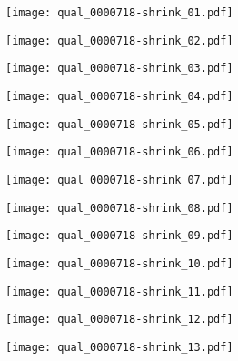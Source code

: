 \documentclass[10pt,twocolumn,letterpaper]{article}
\begin{document}
\begin{figure*}[t]
\centering
\begin{minipage}{0.058\textwidth} \centering \texttt{[image: qual\_0000718-shrink\_01.pdf]} \end{minipage}
 \begin{minipage}{0.058\textwidth} \centering \texttt{[image: qual\_0000718-shrink\_02.pdf]} \end{minipage}
 \begin{minipage}{0.058\textwidth} \centering \texttt{[image: qual\_0000718-shrink\_03.pdf]} \end{minipage}
 \begin{minipage}{0.058\textwidth} \centering \texttt{[image: qual\_0000718-shrink\_04.pdf]} \end{minipage}
 \begin{minipage}{0.058\textwidth} \centering \texttt{[image: qual\_0000718-shrink\_05.pdf]} \end{minipage}
 \begin{minipage}{0.058\textwidth} \centering \texttt{[image: qual\_0000718-shrink\_06.pdf]} \end{minipage}
 \begin{minipage}{0.058\textwidth} \centering \texttt{[image: qual\_0000718-shrink\_07.pdf]} \end{minipage}
 \begin{minipage}{0.058\textwidth} \centering \texttt{[image: qual\_0000718-shrink\_08.pdf]} \end{minipage}
 \begin{minipage}{0.058\textwidth} \centering \texttt{[image: qual\_0000718-shrink\_09.pdf]} \end{minipage}
 \begin{minipage}{0.058\textwidth} \centering \texttt{[image: qual\_0000718-shrink\_10.pdf]} \end{minipage}
 \begin{minipage}{0.058\textwidth} \centering \texttt{[image: qual\_0000718-shrink\_11.pdf]} \end{minipage}
 \begin{minipage}{0.058\textwidth} \centering \texttt{[image: qual\_0000718-shrink\_12.pdf]} \end{minipage}
 \begin{minipage}{0.058\textwidth} \centering \texttt{[image: qual\_0000718-shrink\_13.pdf]} \end{minipage}

\end{figure*}
\end{document}
